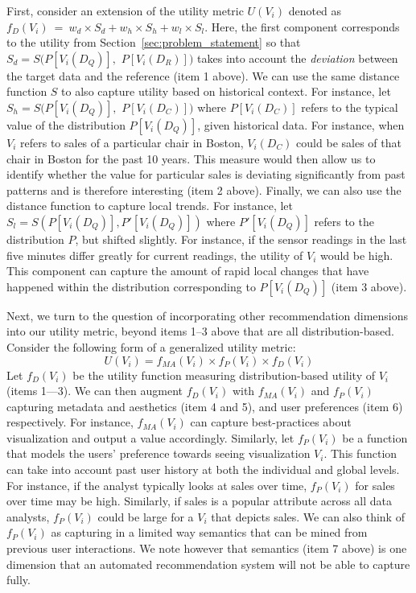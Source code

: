 {First, consider an extension of the utility metric  
$U (V_i)$ denoted as $f_D (V_i)\ =\ w_d \times S_d + w_h \times S_h + w_l  \times S_l$.
Here, the first component corresponds to the utility  
from Section~\ref{sec:problem_statement}
so that $S_d = S ( P[V_i (D_Q)],$ $P[V_i (D_R)] )$ 
takes into account the {\em deviation} between the target data and the reference (item 1 above).
We can use the same distance function $S$ to also capture utility based on historical context. 
For instance, let $S_h = S ( P[V_i (D_Q)], $ $P[V_i (D_C)] )$ where
$P[V_i (D_C)]$ refers to the typical value of the distribution 
$P[V_i (D_Q)]$, given historical data.
For instance, when $V_i$ refers to sales of a particular chair in 
Boston, $V_i(D_C)$ could be sales of that chair in Boston for the past 10 years.
This measure would then allow us to identify whether the value for particular sales is 
deviating significantly from past patterns and is therefore interesting (item 2 above).
Finally, we can also use the distance function to capture local trends.
For instance, let $S_l = S ( P[V_i (D_Q)], P'[V_i (D_Q)] )$ where
$P'[V_i (D_Q)]$ refers to the distribution $P$, but shifted slightly.
For instance, if the sensor readings in the last five minutes differ greatly
for current readings, the utility of $V_i$ would be high.
This component can capture
the amount of rapid local changes that have happened
within the distribution corresponding to $P[V_i (D_Q)]$ (item 3 above).

Next, we turn to the question of incorporating other recommendation dimensions into our utility 
metric, beyond items 1--3 above that are all distribution-based.
Consider the following form of a generalized utility metric:
$$ U (V_i) = f_{MA}(V_i) \times f_P (V_i) \times f_D (V_i)$$
Let $f_D (V_i)$ be the utility function measuring distribution-based utility of $V_i$ (items 1---3).
We can then augment $f_D (V_i)$ with $f_{MA}(V_i)$ and $f_P (V_i)$ capturing metadata  and aesthetics (item 4 and 5), and user preferences (item 6) respectively.
For instance, $f_{MA}(V_i)$ can capture best-practices about 
visualization and output a  value accordingly.
Similarly, let $f_P (V_i)$ be a function that models the users' preference towards seeing visualization $V_i$.
This function can take into account past user history at both the individual and global levels.
For instance, if the analyst typically looks at sales over time, $f_P (V_i)$ for sales over time
may be high.
Similarly, if sales is a popular attribute across all data analysts, $f_P (V_i)$ could be large for
a $V_i$ that depicts sales.
We can also think of $f_P (V_i)$ as capturing in a limited way semantics 
that can be mined from previous user interactions.
We note however that semantics (item 7 above) is one dimension that an automated 
recommendation system will not be able to capture fully.

}
